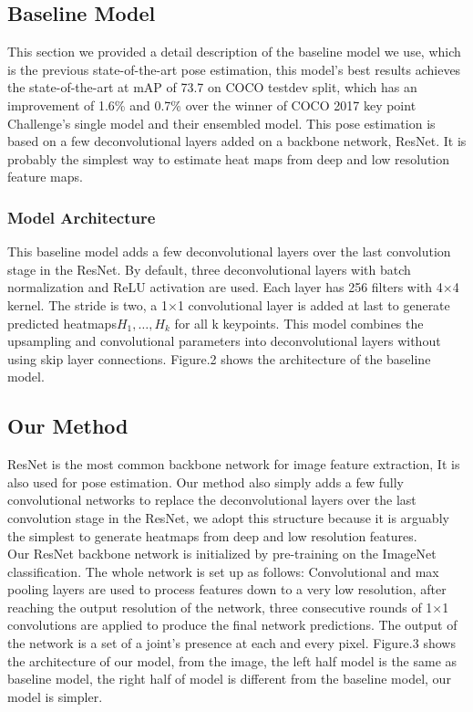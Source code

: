 \documentclass[final]{cvpr}
\begin{document}
\subsection{Baseline Model}
This section we provided a detail description of the baseline model we use, which is the previous state-of-the-art pose estimation, this model's best results achieves the state-of-the-art at mAP of 73.7 on COCO testdev split, which has an improvement of 1.6\% and 0.7\% over the winner of COCO 2017 key point Challenge's single model and their ensembled model. This pose estimation is based on a few deconvolutional layers added on a backbone network, ResNet\cite{he2016deep}. It is probably the simplest way to estimate heat maps from deep and low resolution feature maps.\\
\subsubsection{Model Architecture}
This baseline model adds a few deconvolutional layers over the last convolution stage in the ResNet. By default, three deconvolutional layers with batch normalization and ReLU activation are used. Each layer has 256 filters with 4$\times$4 kernel. The stride is two, a 1$\times$1 convolutional layer is added at last to generate predicted heatmaps${H_1,\ldots,H_k}$ for all k keypoints. This model combines the upsampling and convolutional parameters into deconvolutional layers without using skip layer connections. Figure.2 shows the architecture of the baseline model.
\subsection{Our Method}
ResNet is the most common backbone network for image feature extraction, It is also used for pose estimation. Our method also simply adds a few fully convolutional networks to replace the deconvolutional layers over the last convolution stage in the ResNet, we adopt this structure because it is arguably the simplest to generate heatmaps from deep and low resolution features. \\
\indent Our ResNet\cite{he2016deep} backbone network is initialized by pre-training on the ImageNet classification. The whole network is set up as follows: Convolutional and max pooling layers are used to process features down to a very low resolution, after reaching the output resolution of the network, three consecutive rounds of 1$\times$1 convolutions are applied to produce the final network predictions. The output of the network is a set of a joint's presence at each and every pixel. Figure.3 shows the architecture of our model, from the image, the left half model is the same as baseline model, the right half of model is different from the baseline model, our model is simpler.
\end{document}
